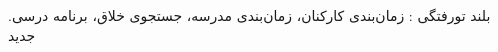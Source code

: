 


\pagestyle{empty}



‌بلند
‌تورفتگی : 
زمان‌بندی کارکنان، زمان‌بندی مدرسه، جستجوی خلاق، برنامه درسی.
‌جدید
